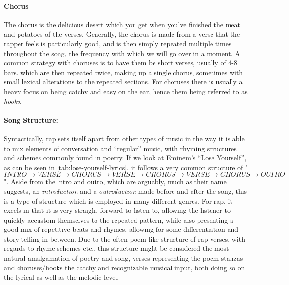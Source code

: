 \paragraph{Chorus}
The chorus is the delicious desert which you get when you've finished the meat and potatoes of the verses. Generally, the chorus is made from a verse that the rapper feels is particularly good, and is then simply repeated multiple times throughout the song, the frequency with which we will go over in \hyperref[para:song-structure]{a moment}. A common strategy with choruses is to have them be short verses, usually of 4-8 bars, which are then repeated twice, making up a single chorus, sometimes with small lexical alterations to the repeated sections. For choruses there is usually a heavy focus on being catchy and easy on the ear, hence them being referred to as \textit{hooks}.

\paragraph{Song Structure:\\[6pt]}
\label{para:song-structure}

Syntactically, rap sets itself apart from other types of music in the way it is able to mix elements of conversation and “regular” music, with rhyming structures and schemes commonly found in poetry. If we look at Eminem’s “Lose Yourself”, as can be seen in \cref{tab:lose-yourself-lyrics}, it follows a very common structure of "$INTRO \rightarrow VERSE \rightarrow CHORUS \rightarrow VERSE \rightarrow CHORUS \rightarrow VERSE \rightarrow CHORUS \rightarrow OUTRO$". Aside from the intro and outro, which are arguably, much as their name suggests, an \textit{introduction} and a \textit{outroduction} made before and after the song, this is a type of structure which is employed in many different genres. For rap, it excels in that it is very straight forward to listen to, allowing the listener to quickly accustom themselves to the repeated pattern, while also presenting a good mix of repetitive beats and rhymes, allowing for some differentiation and story-telling in-between. Due to the often poem-like structure of rap verses, with regards to rhyme schemes etc., this structure might be considered the most natural amalgamation of poetry and song, verses representing the poem stanzas and choruses/hooks the catchy and recognizable musical input, both doing so on the lyrical as well as the melodic level.

